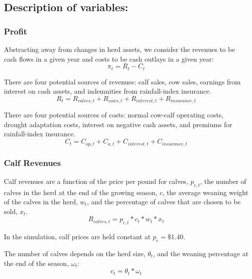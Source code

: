 \documentclass[11pt]{article}
\begin{document}
\subsection{Description of variables:}


\subsubsection{Profit}
Abstracting away from changes in herd assets, we consider the revenues to be cash flows in a given year and costs to be cash outlays in a given year:
\begin{equation}
\pi_t = R_t - C_t
\end{equation}

There are four potential sources of revenues: calf sales, cow sales, earnings from interest on cash assets, and indemnities from rainfall-index insurance.
\begin{equation}
R_t = R_{calves,t} + R_{cows,t} + R_{interest,t} + R_{insurance,t}
\end{equation}

There are four potential sources of costs: normal cow-calf operating costs, drought adaptation costs, interest on negative cash assets, and premiums for rainfall-index insurance.
\begin{equation}
C_t = C_{op,t} + C_{a,t} + C_{interest,t} + C_{insurance,t}
\end{equation}

\subsubsection{Calf Revenues}
Calf revenues are a function of the price per pound for calves, $p_{c,t}$, the number of calves in the herd at the end of the growing season, $c$, the average weaning weight of the calves in the herd, $w_t$, and the percentage of calves that are chosen to be sold, $x_t$.
\begin{equation}
R_{calves,t} = p_{c,t} * c_t * w_t * x_t 
\end{equation}

In the simulation, calf prices are held constant at $p_{c} = \$1.40$. 

The number of calves depends on the herd size, $\theta_t$, and the weaning percentage at the end of the season, $\omega_t$:
\begin{equation}
c_t = \theta_t * \omega_t
\end{equation}

\end{document}
